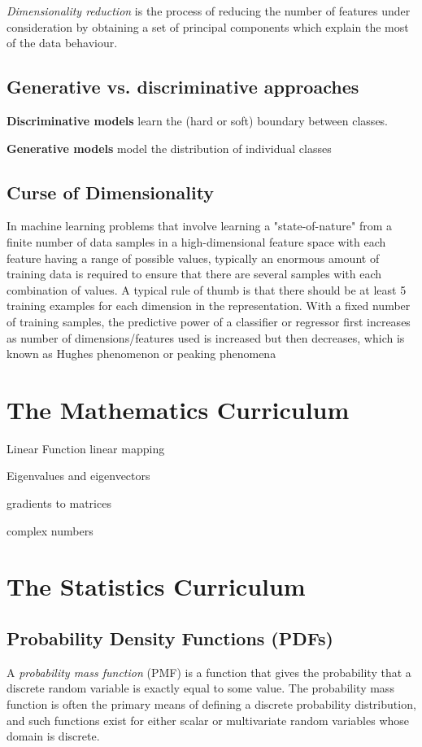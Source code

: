 \documentclass[11pt]{article}
\theoremstyle{plain}
\theoremstyle{definition}
\begin{document}
\textit{Dimensionality reduction} is the process of reducing the number of features under consideration by obtaining a set of principal components which explain the most of the data behaviour.

\subsection{Generative vs. discriminative approaches}
\textbf{Discriminative models}  learn the (hard or soft) boundary between classes.

\noindent\textbf{Generative models}  model the distribution of individual classes

\subsection{Curse of Dimensionality}
In machine learning problems that involve learning a "state-of-nature" from a finite number of data samples in a high-dimensional feature space with each feature having a range of possible values, typically an enormous amount of training data is required to ensure that there are several samples with each combination of values. A typical rule of thumb is that there should be at least 5 training examples for each dimension in the representation. With a fixed number of training samples, the predictive power of a classifier or regressor first increases as number of dimensions/features used is increased but then decreases, which is known as Hughes phenomenon or peaking phenomena


\section{The Mathematics Curriculum}
Linear Function linear mapping

Eigenvalues and eigenvectors

gradients to matrices

complex numbers



\section{The Statistics Curriculum}
\subsection{Probability Density Functions (PDFs)}
A \textit{probability mass function} (PMF) is a function that gives the probability that a discrete random variable is exactly equal to some value. The probability mass function is often the primary means of defining a discrete probability distribution, and such functions exist for either scalar or multivariate random variables whose domain is discrete.
\end{document}
